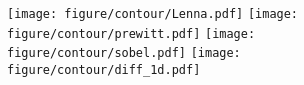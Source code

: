 \begin{comment}
\begin{figure}[h]
\texttt{[image: figure/contour/1d.pdf]}
\texttt{[image: figure/contour/Lenna.pdf]}
\texttt{[image: figure/contour/fft\_contour\_circle.pdf]}
\texttt{[image: figure/contour/fft\_contour\_square.pdf]}
\texttt{[image: figure/contour/fft\_countour\_spectral.pdf]}
\texttt{[image: figure/contour/high\_circle\_filter.pdf]}
\texttt{[image: figure/contour/high\_path\_spectral\_circle.pdf]}
\texttt{[image: figure/contour/high\_path\_spectral\_square.pdf]}
\texttt{[image: figure/contour/high\_square\_filter.pdf]}
\texttt{[image: figure/contour/lap\_4.pdf]}
\texttt{[image: figure/contour/lap\_8.pdf]}
\texttt{[image: figure/contour/prewitt.pdf]}
\texttt{[image: figure/contour/sobel.pdf]}
\end{figure}
\end{comment}


\begin{figure}[h]
\texttt{[image: figure/contour/Lenna.pdf]}
\texttt{[image: figure/contour/prewitt.pdf]}
\texttt{[image: figure/contour/sobel.pdf]}
\texttt{[image: figure/contour/diff\_1d.pdf]}
\end{figure}
